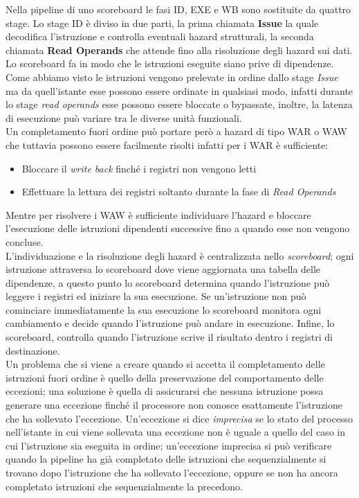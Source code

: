 Nella pipeline di uno scoreboard le fasi ID, EXE e WB sono sostituite da quattro stage. Lo stage ID è diviso in due parti, la prima chiamata \textbf{Issue} la quale decodifica l'istruzione e controlla eventuali hazard strutturali, la seconda chiamata \textbf{Read Operands} che attende fino alla risoluzione degli hazard sui dati. Lo scoreboard fa in modo che le istruzioni eseguite siano prive di dipendenze. Come abbiamo visto le istruzioni vengono prelevate in ordine dallo stage \emph{Issue} ma da quell'istante esse possono essere ordinate in qualsiasi modo, infatti durante lo stage \emph{read operands} esse possono essere bloccate o bypassate, inoltre, la latenza di esecuzione può variare tra le diverse unità funzionali.\\
Un completamento fuori ordine può portare però a hazard di tipo WAR o WAW che tuttavia possono essere facilmente risolti infatti per i WAR è sufficiente:
\begin{itemize}
\item Bloccare il \emph{write back} finché i registri non vengono letti
\item Effettuare la lettura dei registri soltanto durante la fase di \emph{Read Operands}
\end{itemize}
Mentre per risolvere i WAW è sufficiente individuare l'hazard e bloccare l'esecuzione delle istruzioni dipendenti successive fino a quando esse non vengono concluse.\\
L'individuazione e la risoluzione degli hazard è centralizzata nello \emph{scoreboard}; ogni istruzione attraversa lo scoreboard dove viene aggiornata una tabella delle dipendenze, a questo punto lo scoreboard determina quando l'istruzione può leggere i registri ed iniziare la sua esecuzione. Se un'istruzione non può cominciare immediatamente la sua esecuzione lo scoreboard monitora ogni cambiamento e decide quando l'istruzione può andare in esecuzione. Infine, lo scoreboard, controlla quando l'istruzione scrive il risultato dentro i registri di destinazione.\\
Un problema che si viene a creare quando si accetta il completamento delle istruzioni fuori ordine è quello della preservazione del comportamento delle eccezioni; una soluzione è quella di assicurarsi che nessuna istruzione possa generare una eccezione finché il processore non conosce esattamente l'istruzione che ha sollevato l'eccezione. Un'eccezione si dice \emph{imprecisa} se lo stato del processo nell'istante in cui viene sollevata una eccezione non è uguale a quello del caso in cui l'istruzione sia eseguita in ordine; un'eccezione imprecisa si può verificare quando la pipeline ha già completato delle istruzioni che sequenzialmente si trovano dopo l'istruzione che ha sollevato l'eccezione, oppure se non ha ancora completato istruzioni che sequenzialmente la precedono.
